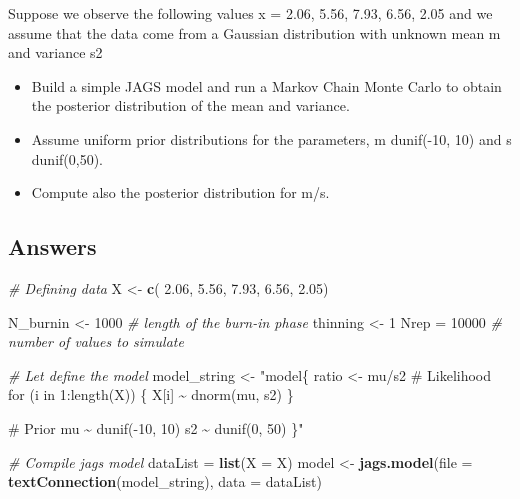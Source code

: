 \documentclass[
]{article}
\newenvironment{Shaded}{\begin{snugshade}}{\end{snugshade}}
\newcommand{\AttributeTok}[1]{\textcolor[rgb]{0.13,0.29,0.53}{#1}}
\newcommand{\CommentTok}[1]{\textcolor[rgb]{0.56,0.35,0.01}{\textit{#1}}}
\newcommand{\DecValTok}[1]{\textcolor[rgb]{0.00,0.00,0.81}{#1}}
\newcommand{\FloatTok}[1]{\textcolor[rgb]{0.00,0.00,0.81}{#1}}
\newcommand{\FunctionTok}[1]{\textcolor[rgb]{0.13,0.29,0.53}{\textbf{#1}}}
\newcommand{\NormalTok}[1]{#1}
\newcommand{\OtherTok}[1]{\textcolor[rgb]{0.56,0.35,0.01}{#1}}
\newcommand{\StringTok}[1]{\textcolor[rgb]{0.31,0.60,0.02}{#1}}
\begin{document}
Suppose we observe the following values x = 2.06, 5.56, 7.93, 6.56, 2.05
and we assume that the data come from a Gaussian distribution with
unknown mean m and variance s2

\begin{itemize}
\item
  Build a simple JAGS model and run a Markov Chain Monte Carlo to obtain
  the posterior distribution of the mean and variance.
\item
  Assume uniform prior distributions for the parameters, m dunif(-10,
  10) and s dunif(0,50).
\item
  Compute also the posterior distribution for m/s.
\end{itemize}

\hypertarget{answers-2}{%
\subsection{Answers}\label{answers-2}}

\begin{Shaded}
\begin{Highlighting}[]
\CommentTok{\# Defining data}
\NormalTok{X }\OtherTok{\textless{}{-}} \FunctionTok{c}\NormalTok{( }\FloatTok{2.06}\NormalTok{, }\FloatTok{5.56}\NormalTok{, }\FloatTok{7.93}\NormalTok{, }\FloatTok{6.56}\NormalTok{, }\FloatTok{2.05}\NormalTok{)}

\NormalTok{N\_burnin }\OtherTok{\textless{}{-}} \DecValTok{1000} \CommentTok{\# length of the burn{-}in phase }
\NormalTok{thinning }\OtherTok{\textless{}{-}} \DecValTok{1}
\NormalTok{Nrep }\OtherTok{=} \DecValTok{10000}     \CommentTok{\# number of values to simulate}

\CommentTok{\# Let\textquotesingle{} define the model}
\NormalTok{model\_string }\OtherTok{\textless{}{-}} \StringTok{"model\{}
\StringTok{  }
\StringTok{  ratio \textless{}{-} mu/s2}
\StringTok{  }
\StringTok{  \# Likelihood}
\StringTok{  for (i in 1:length(X)) \{}
\StringTok{    X[i] \textasciitilde{} dnorm(mu, s2)}
\StringTok{  \}}

\StringTok{  \# Prior}
\StringTok{  mu \textasciitilde{} dunif({-}10, 10)}
\StringTok{  s2 \textasciitilde{} dunif(0, 50)}
\StringTok{  }
\StringTok{\}"}

\CommentTok{\# Compile jags model}
\NormalTok{dataList }\OtherTok{=} \FunctionTok{list}\NormalTok{(}\AttributeTok{X =}\NormalTok{ X)}
\NormalTok{model }\OtherTok{\textless{}{-}} \FunctionTok{jags.model}\NormalTok{(}\AttributeTok{file =} \FunctionTok{textConnection}\NormalTok{(model\_string), }
                    \AttributeTok{data =}\NormalTok{ dataList)}
\end{Highlighting}
\end{Shaded}
\end{document}
